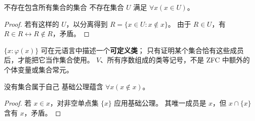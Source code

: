\begin{theorem}{不存在包含所有集合的集合}
不存在集合 \(U\) 满足 \(\forall x(x\in U)\)。
\end{theorem}
\begin{proof}
若有这样的 \(U\)，以分离得到 \(R=\{x\in U:x\notin x\}\)。
由于 \(R\in U\)，有 \(R\in R\leftrightarrow R\notin R\)，矛盾。
\end{proof}
\(\{x:\varphi(x)\}\) 可在元语言中描述一个\textbf{可定义类}；
只有证明某个集合恰有这些成员后，才能把它当作集合使用。
\(V\)、所有序数组成的类等记号，不是 ZFC 中额外的个体变量或集合常元。

\begin{theorem}{没有集合属于自己}
基础公理蕴含 \(\forall x(x\notin x)\)。
\end{theorem}
\begin{proof}
若 \(x\in x\)，对非空单点集 \(\{x\}\) 应用基础公理。
其唯一成员是 \(x\)，但 \(x\cap\{x\}\) 含有 \(x\)，矛盾。
\end{proof}
